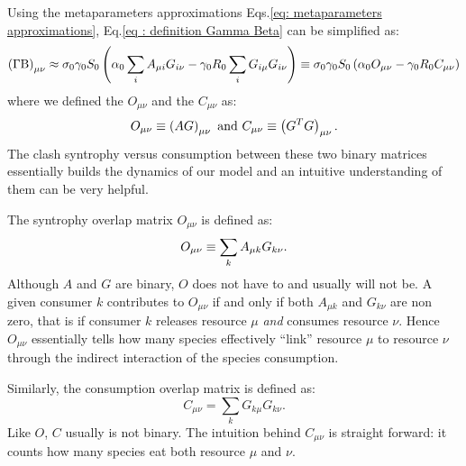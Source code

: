 \documentclass[12pt, titlepage]{report}
\begin{document}
Using the metaparameters approximations Eqs.\eqref{eq: metaparameters approximations}, Eq.\eqref{eq : definition Gamma Beta} can be simplified as:
\begin{equation}\label{eq: metaparam approximation GammaBeta}
\left(\Gamma \text{B}\right)_{\mu \nu}\approx \sigma_0 \gamma_0 S_0 \left(\alpha_0 \sum_i A_{\mu i}G_{i\nu}-\gamma_0 R_0 \sum_i G_{i\mu}G_{i\nu}\right)\equiv \sigma_0 \gamma_0 S_0 \left(\alpha_0 O_{\mu \nu}-\gamma_0R_0 C_{\mu\nu}\right)
\end{equation}
where we defined the  $O_{\mu\nu}$ and the  $C_{\mu\nu}$ as:
\begin{equation}
O_{\mu\nu} \equiv \left(AG\right)_{\mu \nu} \text{ and } C_{\mu\nu} \equiv \left(G^TG\right)_{\mu\nu}.
\end{equation}
The clash syntrophy versus consumption between these two binary matrices essentially builds the dynamics of our model and an intuitive understanding of them can be very helpful.

The syntrophy overlap matrix $O_{\mu\nu}$ is defined as:
\begin{equation}
O_{\mu\nu} \equiv \sum_k A_{\mu k} G_{k\nu}.
\end{equation}
Although $A$ and $G$ are binary, $O$ does not have to and usually will not be. A given consumer $k$ contributes to $O_{\mu\nu}$ if and only if both $A_{\mu k}$ and $G_{k\nu}$ are non zero, that is if consumer $k$ releases resource $\mu$ \textit{and} consumes resource $\nu$. Hence $O_{\mu\nu}$ essentially tells how many species effectively ``link'' resource $\mu$ to resource $\nu$ through the indirect interaction of the species consumption.

Similarly, the consumption overlap matrix is defined as:
\begin{equation}
C_{\mu\nu}=\sum_k G_{k \mu}G_{k \nu}.
\end{equation}
Like $O$, $C$ usually is not binary. The intuition behind $C_{\mu\nu}$ is straight forward: it counts how many species eat both resource $\mu$ and $\nu$.
\end{document}
